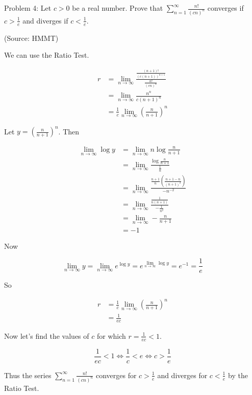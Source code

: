 Problem 4: Let $c > 0$ be a real number. Prove that $\displaystyle \sum_{n=1}^\infty \frac{n!}{(cn)^n}$ converges if $\displaystyle c > \frac{1}{e}$ and diverges if $\displaystyle c < \frac{1}{e}$.

(Source: HMMT)

We can use the Ratio Test.

\begin{align*}
r &= \lim_{n \rightarrow \infty} \frac{\frac{(n+1)!}{(c(n+1))^{n+1}}}{\frac{n!}{(cn)^{n}}} \\
&= \lim_{n \rightarrow \infty} \frac{n^n}{c(n+1)^{n}} \\
&= \frac{1}{c} \lim_{n \rightarrow \infty} \left(\frac{n}{n+1}\right)^n
\end{align*}

Let $y = \left(\frac{n}{n+1}\right)^n$. Then

\begin{align*}
\lim_{n \rightarrow \infty} \log y &= \lim_{n \rightarrow \infty} n \log{\frac{n}{n+1}} \\
&= \lim_{n \rightarrow \infty} \frac{\log{\frac{n}{n+1}}}{\frac{1}{n}} \\
&= \lim_{n \rightarrow \infty} \frac{\frac{n+1}{n} \left(\frac{n+1 - n}{(n+1)^2}\right)}{-n^{-2}} \\
&= \lim_{n \rightarrow \infty} \frac{\frac{1}{n(n+1)}}{-\frac{1}{n^2}} \\
&= \lim_{n \rightarrow \infty} - \frac{n}{n+1} \\
&= -1
\end{align*}

Now

$$ \lim_{n \rightarrow \infty} y = \lim_{n \rightarrow \infty} e^{\log y} = e^{\lim_{n \rightarrow \infty} \log y} = e^{-1} = \frac{1}{e} $$

So

\begin{align*}
r &= \frac{1}{c} \lim_{n \rightarrow \infty} \left(\frac{n}{n+1}\right)^n \\
&= \frac{1}{ec}
\end{align*}

Now let's find the values of $c$ for which $\displaystyle r = \frac{1}{ec} < 1$.

$$ \frac{1}{ec} < 1 \iff \frac{1}{c} < e \iff c > \frac{1}{e} $$

Thus the series $\displaystyle \sum_{n=1}^{\infty} \frac{n!}{(cn)^n}$ converges for $\displaystyle c > \frac{1}{e}$ and diverges for $\displaystyle c < \frac{1}{e}$ by the Ratio Test.
